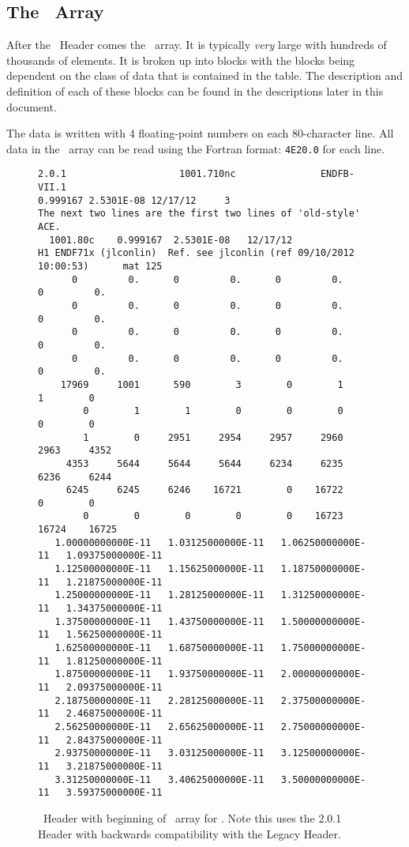 \subsection{The \XSS\ Array}
After the \ACE\ Header comes the \XSS\ array. It is typically \emph{very} large with hundreds of thousands of elements. It is broken up into blocks with the blocks being dependent on the class of data that is contained in the table. The description and definition of each of these blocks can be found in the descriptions later in this document.

The data is written with \num{4} floating-point numbers on each 80-character line.  All data in the \XSS\ array can be read using the Fortran format: \verb|4E20.0| for each line.

\begin{figure}[h!] \centering
\begin{Verbatim}[frame=single,fontsize=\footnotesize,numbersep=2pt]
2.0.1                    1001.710nc               ENDFB-VII.1             
0.999167 2.5301E-08 12/17/12     3
The next two lines are the first two lines of 'old-style' ACE.
  1001.80c    0.999167  2.5301E-08   12/17/12
H1 ENDF71x (jlconlin)  Ref. see jlconlin (ref 09/10/2012  10:00:53)      mat 125
      0         0.      0         0.      0         0.      0         0.
      0         0.      0         0.      0         0.      0         0.
      0         0.      0         0.      0         0.      0         0.
      0         0.      0         0.      0         0.      0         0.
    17969     1001      590        3        0        1        1        0
        0        1        1        0        0        0        0        0
        1        0     2951     2954     2957     2960     2963     4352
     4353     5644     5644     5644     6234     6235     6236     6244
     6245     6245     6246    16721        0    16722        0        0
        0        0        0        0        0    16723    16724    16725
   1.00000000000E-11   1.03125000000E-11   1.06250000000E-11   1.09375000000E-11
   1.12500000000E-11   1.15625000000E-11   1.18750000000E-11   1.21875000000E-11
   1.25000000000E-11   1.28125000000E-11   1.31250000000E-11   1.34375000000E-11
   1.37500000000E-11   1.43750000000E-11   1.50000000000E-11   1.56250000000E-11
   1.62500000000E-11   1.68750000000E-11   1.75000000000E-11   1.81250000000E-11
   1.87500000000E-11   1.93750000000E-11   2.00000000000E-11   2.09375000000E-11
   2.18750000000E-11   2.28125000000E-11   2.37500000000E-11   2.46875000000E-11
   2.56250000000E-11   2.65625000000E-11   2.75000000000E-11   2.84375000000E-11
   2.93750000000E-11   3.03125000000E-11   3.12500000000E-11   3.21875000000E-11
   3.31250000000E-11   3.40625000000E-11   3.50000000000E-11   3.59375000000E-11
\end{Verbatim}
\caption{\ACE\ Header with beginning of \XSS\ array for . Note this uses the 2.0.1 Header with backwards compatibility with the Legacy Header.}
  \label{fig:XSSExample}
\end{figure}
